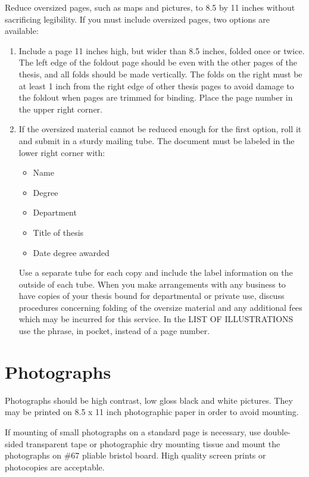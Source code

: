 \documentclass[draft]{ua-thesis}
\begin{document}
Reduce oversized pages, such as maps and pictures, to 8.5 by 11 inches
without sacrificing legibility. If you must include oversized pages, two
options are available:
\begin{enumerate}
  \item Include a page 11 inches high, but wider than 8.5 inches, folded once
     or twice. The left edge of the foldout page should be even with the
     other pages of the thesis, and all folds should be made vertically. The
     folds on the right must be at least 1 inch from the right edge of other
     thesis pages to avoid damage to the foldout when pages are trimmed for
     binding. Place the page number in the upper right corner.

  \item If the oversized material cannot be reduced enough for the first
     option, roll it and submit in a sturdy mailing tube. The document must
     be labeled in the lower right corner with:
     \begin{itemize}
          \item Name
          \item Degree
          \item Department
          \item Title of thesis
          \item Date degree awarded
     \end{itemize}
     Use a separate tube for each copy and include the label information on
     the outside of each tube. When you make arrangements with any business
     to have copies of your thesis bound for departmental or private use,
     discuss procedures concerning folding of the oversize material and any
     additional fees which may be incurred for this service. In the LIST OF
     ILLUSTRATIONS use the phrase, in pocket, instead of a page number.
\end{enumerate}

\chapter{Photographs}

Photographs should be high contrast, low gloss black and white pictures.
They may be printed on 8.5 x 11 inch photographic paper in order to avoid
mounting.

If mounting of small photographs on a standard page is necessary, use
double-sided transparent tape or photographic dry mounting tissue and mount
the photographs on \#67 pliable bristol board. High quality screen prints
or photocopies are acceptable.
\end{document}
